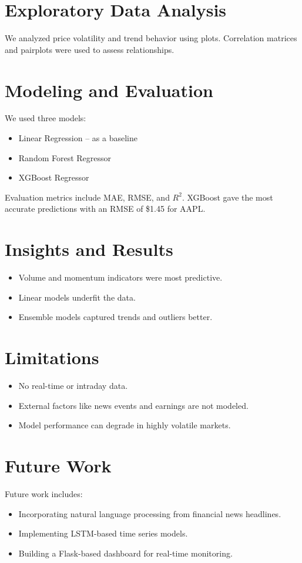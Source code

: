 \documentclass[runningheads]{llncs}
\begin{document}
{{\section{Exploratory Data Analysis}
We analyzed price volatility and trend behavior using plots. Correlation matrices and pairplots were used to assess relationships.

\section{Modeling and Evaluation}
We used three models:
\begin{itemize}
    \item Linear Regression – as a baseline
    \item Random Forest Regressor
    \item XGBoost Regressor
\end{itemize}
Evaluation metrics include MAE, RMSE, and $R^2$. XGBoost gave the most accurate predictions with an RMSE of \$1.45 for AAPL.

\section{Insights and Results}
\begin{itemize}
    \item Volume and momentum indicators were most predictive.
    \item Linear models underfit the data.
    \item Ensemble models captured trends and outliers better.
\end{itemize}

\section{Limitations}
\begin{itemize}
    \item No real-time or intraday data.
    \item External factors like news events and earnings are not modeled.
    \item Model performance can degrade in highly volatile markets.
\end{itemize}

\section{Future Work}
Future work includes:
\begin{itemize}
    \item Incorporating natural language processing from financial news headlines.
    \item Implementing LSTM-based time series models.
    \item Building a Flask-based dashboard for real-time monitoring.
\end{itemize}

}}
\end{document}
